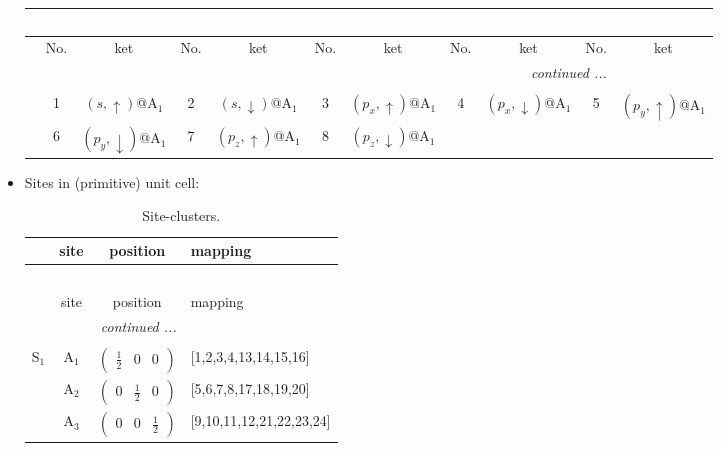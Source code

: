 \documentclass[fleqn,10pt,landscape]{article}
\begin{document}
\begin{itemize}
\begin{center}
\begin{longtable}{c|cc|cc|cc|cc|cc}
\multicolumn{10}{l}{\tablename\ \thetable{}} \\
 \hline \hline
 & No. & ket & No. & ket & No. & ket & No. & ket & No. & ket \\ \hline \endhead

 \hline \hline
\multicolumn{10}{r}{\footnotesize\it continued ...} \\ \endfoot

 \hline \hline
\multicolumn{10}{r}{} \\ \endlastfoot

 & 1 & $(s,\uparrow)$@A$_{1}$ & 2 & $(s,\downarrow)$@A$_{1}$ & 3 & $(p_{x},\uparrow)$@A$_{1}$ & 4 & $(p_{x},\downarrow)$@A$_{1}$ & 5 & $(p_{y},\uparrow)$@A$_{1}$ \\
& 6 & $(p_{y},\downarrow)$@A$_{1}$ & 7 & $(p_{z},\uparrow)$@A$_{1}$ & 8 & $(p_{z},\downarrow)$@A$_{1}$ &  &  &  &  \\
\end{longtable}
\end{center}

\item Sites in (primitive) unit cell:
\begin{center}
\renewcommand{\arraystretch}{1.3}
\begin{longtable}{cc|c|l}
\caption{Site-clusters.}
 \\
 \hline \hline
 & site & position & mapping \\ \hline \endfirsthead

\multicolumn{3}{l}{\tablename\ \thetable{}} \\
 \hline \hline
 & site & position & mapping \\ \hline \endhead

 \hline \hline
\multicolumn{3}{r}{\footnotesize\it continued ...} \\ \endfoot

 \hline \hline
\multicolumn{3}{r}{} \\ \endlastfoot

S$_{1}$ & A$_1$ & $\begin{pmatrix} \frac{1}{2} & 0 & 0 \end{pmatrix}$ & [1,2,3,4,13,14,15,16] \\
& A$_2$ & $\begin{pmatrix} 0 & \frac{1}{2} & 0 \end{pmatrix}$ & [5,6,7,8,17,18,19,20] \\
& A$_3$ & $\begin{pmatrix} 0 & 0 & \frac{1}{2} \end{pmatrix}$ & [9,10,11,12,21,22,23,24] \\
\end{longtable}
\end{center}


\end{itemize}
\end{document}
